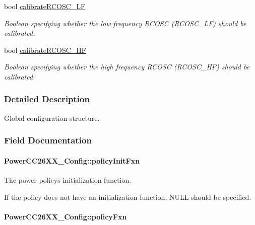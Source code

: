 \begin{DoxyCompactItemize}
bool \hyperlink{struct_power_c_c26_x_x___config_ae5541ad9e9fb883e9bdf9c68d1c0226b}{calibrate\+R\+C\+O\+S\+C\+\_\+\+L\+F}
\begin{DoxyCompactList}\small\item\em Boolean specifying whether the low frequency R\+C\+O\+S\+C (R\+C\+O\+S\+C\+\_\+\+L\+F) should be calibrated. \end{DoxyCompactList}\item 
bool \hyperlink{struct_power_c_c26_x_x___config_a896b6c56c0d1be28de7ce4ef09fe616a}{calibrate\+R\+C\+O\+S\+C\+\_\+\+H\+F}
\begin{DoxyCompactList}\small\item\em Boolean specifying whether the high frequency R\+C\+O\+S\+C (R\+C\+O\+S\+C\+\_\+\+H\+F) should be calibrated. \end{DoxyCompactList}\end{DoxyCompactItemize}


\subsubsection{Detailed Description}
Global configuration structure. 

\subsubsection{Field Documentation}
\paragraph[{policy\+Init\+Fxn}]{ Power\+C\+C26\+X\+X\+\_\+\+Config\+::policy\+Init\+Fxn}\label{struct_power_c_c26_x_x___config_aa5fa2edd433b84788c63277a21bc8dea}


The power policy\textquotesingle{}s initialization function. 

If the policy does not have an initialization function, \textquotesingle{}N\+U\+L\+L\textquotesingle{} should be specified. 
\paragraph[{policy\+Fxn}]{ Power\+C\+C26\+X\+X\+\_\+\+Config\+::policy\+Fxn}\label{struct_power_c_c26_x_x___config_acd4011995544865f832440e9d869b563}


